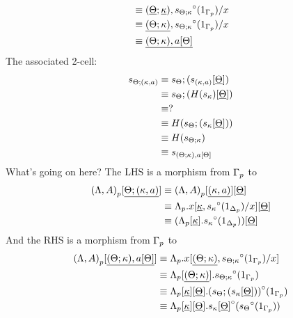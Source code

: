 \documentclass[10pt]{article}
\theoremstyle{definition}
\newcommand\TrCirc[2]{\ensuremath{{#1}^\circ(#2)}}
\begin{document}
\begin{enumerate}[style = multiline, labelwidth = 80pt]
\begin{align*}
&\equiv (\downstairs{\Theta}; \downstairs{\kappa}) , \TrCirc{s_{\Theta ; \kappa}}{1_{\asdep{\Gamma}}} / x \\
&\equiv \downstairs{(\Theta ; \kappa)} , \TrCirc{s_{\Theta ; \kappa}}{1_{\asdep{\Gamma}}} / x \\
&\equiv \downstairs{(\Theta ; \kappa) , a[\Theta] }
\end{align*}
The associated 2-cell:
\begin{align*}
s_{\Theta ; (\kappa , a)} 
&\equiv s_\Theta ; (s_{(\kappa , a)}[\underline{\Theta}]) \\
&\equiv s_\Theta ; (H(s_\kappa)[\underline{\Theta}]) \\
&\equiv ? \\
&\equiv H(s_{\Theta} ; (s_\kappa[\underline{\Theta}])) \\
&\equiv H(s_{\Theta ; \kappa}) \\
&\equiv s_{(\Theta ; \kappa) , a[\Theta]}
\end{align*}
What's going on here? The LHS is a morphism from ${\Gamma}_p$ to
\begin{align*}
\asdep{(\Lambda,A)}[\downstairs{\Theta ; (\kappa , a)}]
&\equiv \asdep{(\Lambda,A)}[\downstairs{(\kappa , a)}][\downstairs{\Theta}] \\
&\equiv \asdep{\Lambda}.x[\downstairs{\kappa} , \TrCirc{s_{\kappa}}{1_{\asdep{\Delta}}}/x][\downstairs{\Theta}] \\
&\equiv (\asdep{\Lambda}[\downstairs{\kappa}].\TrCirc{s_{\kappa}}{1_{\asdep{\Delta}}})[\downstairs{\Theta}] \\
\end{align*}
And the RHS is a morphism from ${\Gamma}_p$ to
\begin{align*}
\asdep{(\Lambda,A)}[\downstairs{(\Theta ; \kappa) , a[\Theta]}]
&\equiv \asdep{\Lambda}.x[\downstairs{(\Theta ; \kappa)}, \TrCirc{s_{\Theta ; \kappa}}{1_{\asdep{\Gamma}}}/x] \\
&\equiv \asdep{\Lambda}[\downstairs{(\Theta ; \kappa)}].\TrCirc{s_{\Theta ; \kappa}}{1_{\asdep{\Gamma}}} \\
&\equiv \asdep{\Lambda}[\downstairs{\kappa}][\downstairs{\Theta}].\TrCirc{(s_{\Theta} ; (s_\kappa[\downstairs{\Theta}]))}{1_{\asdep{\Gamma}}} \\
&\equiv \asdep{\Lambda}[\downstairs{\kappa}][\downstairs{\Theta}]. \TrCirc{s_\kappa[\downstairs{\Theta}]}{\TrCirc{s_{\Theta}}{1_{\asdep{\Gamma}}}}
\end{align*}


\end{enumerate}
\end{document}
